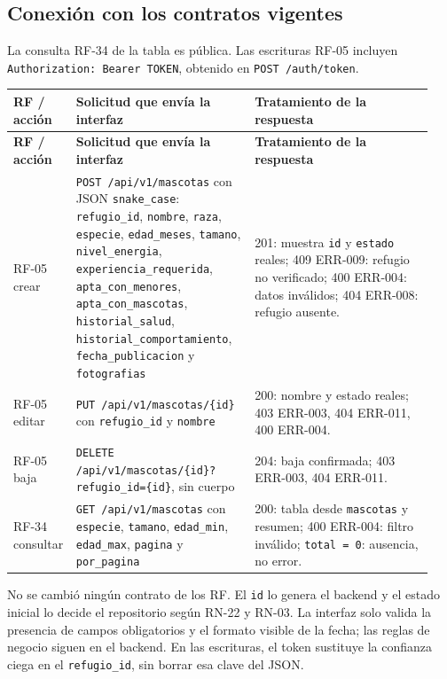 \documentclass[11pt,a4paper]{article}
\newcommand{\code}[1]{\texttt{#1}}
\newcommand{\thead}[1]{\textbf{#1}}
\begin{document}
\subsection{Conexión con los contratos vigentes}

La consulta RF-34 de la tabla es pública. Las escrituras RF-05 incluyen
\code{Authorization: Bearer TOKEN}, obtenido en \code{POST /auth/token}.

{\footnotesize
\begin{longtable}{@{}A{0.10\linewidth}A{0.42\linewidth}A{0.42\linewidth}@{}}
\toprule
\thead{RF / acción} & \thead{Solicitud que envía la interfaz} &
\thead{Tratamiento de la respuesta} \\ \midrule \endfirsthead
\thead{RF / acción} & \thead{Solicitud que envía la interfaz} &
\thead{Tratamiento de la respuesta} \\ \midrule \endhead
\bottomrule
\endlastfoot
RF-05 crear & \code{POST /api/v1/mascotas} con JSON \code{snake\_case}:
\code{refugio\_id}, \code{nombre}, \code{raza}, \code{especie},
\code{edad\_meses}, \code{tamano}, \code{nivel\_energia},
\code{experiencia\_requerida}, \code{apta\_con\_menores},
\code{apta\_con\_mascotas}, \code{historial\_salud},
\code{historial\_comportamiento}, \code{fecha\_publicacion} y
\code{fotografias} &
201: muestra \code{id} y \code{estado} reales; 409 ERR-009: refugio no
verificado; 400 ERR-004: datos inválidos; 404 ERR-008: refugio ausente. \\
RF-05 editar & \code{PUT /api/v1/mascotas/\{id\}} con \code{refugio\_id} y
\code{nombre} &
200: nombre y estado reales; 403 ERR-003, 404 ERR-011, 400 ERR-004. \\
RF-05 baja & \code{DELETE /api/v1/mascotas/\{id\}?refugio\_id=\{id\}}, sin cuerpo &
204: baja confirmada; 403 ERR-003, 404 ERR-011. \\
RF-34 consultar & \code{GET /api/v1/mascotas} con \code{especie}, \code{tamano},
\code{edad\_min}, \code{edad\_max}, \code{pagina} y \code{por\_pagina} &
200: tabla desde \code{mascotas} y resumen; 400 ERR-004: filtro inválido;
\code{total = 0}: ausencia, no error. \\
\end{longtable}
}

No se cambió ningún contrato de los RF. El \code{id} lo genera el backend y el
estado inicial lo decide el repositorio según RN-22 y RN-03. La interfaz solo
valida la presencia de campos obligatorios y el formato visible de la fecha; las
reglas de negocio siguen en el backend. En las escrituras, el token sustituye la
confianza ciega en el \code{refugio\_id}, sin borrar esa clave del JSON.
\end{document}
